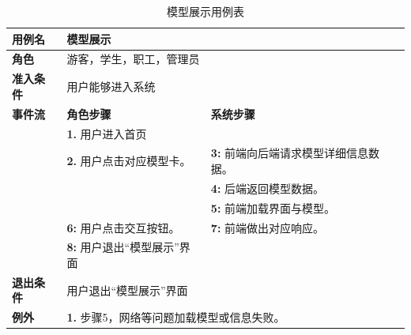 \begin{table}[H]
  \centering
  \renewcommand\arraystretch{1.1}
  \small
  \caption{模型展示用例表}
  \setlength{\tabcolsep}{4mm}
  \begin{tabular}{|p{2cm}|p{5.75cm}|p{5.75cm}|}
    \hline \textbf{用例名} & \multicolumn{2}{l|}{模型展示} \\
    \hline \textbf{角色} & \multicolumn{2}{l|}{游客，学生，职工，管理员} \\
    \hline \textbf{准入条件} & \multicolumn{2}{l|}{用户能够进入系统} \\
    \hline \textbf{事件流} & \textbf{角色步骤} & \textbf{系统步骤} \\
    \hline \multirow{3}{*}{~} & \textbf{1.} 用户进入首页  &    \\
    \cline{2-3} & \textbf{2.} 用户点击对应模型卡。 & \textbf{3:} 前端向后端请求模型详细信息数据。 \\
    \cline{2-3} &  & \textbf{4:} 后端返回模型数据。 \\
    \cline{2-3} &  & \textbf{5:} 前端加载界面与模型。 \\
    \cline{2-3} & \textbf{6:} 用户点击交互按钮。 & \textbf{7:} 前端做出对应响应。 \\
    \cline{2-3} & \textbf{8:} 用户退出``模型展示''界面 &  \\
    \hline \textbf{退出条件}  & \multicolumn{2}{l|}{用户退出``模型展示''界面} \\
    \hline \multirow{1}{*}{\textbf{例外}} & \multicolumn{2}{l|}{\textbf{1.} 步骤5，网络等问题加载模型或信息失败。} \\
    \hline
  \end{tabular}
\end{table}

